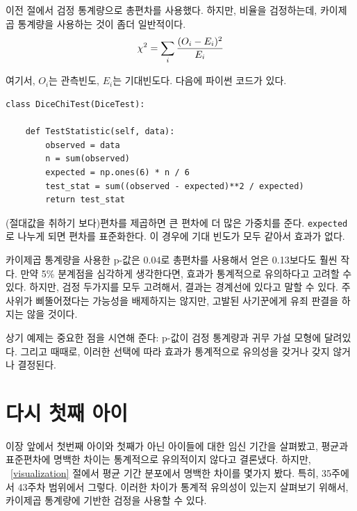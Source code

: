 이전 절에서 검정 통계량으로 총편차를 사용했다. 하지만,
비율을 검정하는데, 카이제곱 통계량을 사용하는 것이 좀더 일반적이다.
%
\[ \chi^2 = \sum_i \frac{(O_i - E_i)^2}{E_i} \]
%
% 

여기서, $O_i$는 관측빈도, $E_i$는 기대빈도다. 다음에 파이썬 코드가 있다.

\begin{verbatim}
class DiceChiTest(DiceTest):

    def TestStatistic(self, data):
        observed = data
        n = sum(observed)
        expected = np.ones(6) * n / 6
        test_stat = sum((observed - expected)**2 / expected)
        return test_stat
\end{verbatim}

(절대값을 취하기 보다)편차를 제곱하면 큰 편차에 더 많은 가중치를 준다.
{\tt expected}로 나누게 되면 편차를 표준화한다. 이 경우에 기대 빈도가 모두 같아서 효과가 없다.


카이제곱 통계량을 사용한 p-값은 0.04로 총편차를 사용해서 얻은 0.13보다도 훨씬 작다. 만약 5\% 분계점을 심각하게 생각한다면, 효과가 통계적으로 유의하다고 고려할 수 있다. 하지만, 검정 두가지를 모두 고려해서, 결과는 경계선에 있다고 말할 수 있다. 주사위가 삐뚤어졌다는 가능성을 배제하지는 않지만, 고발된 사기꾼에게 유죄 판결을 하지는 않을 것이다.


상기 예제는 중요한 점을 시연해 준다: p-값이 검정 통계량과 귀무 가설 모형에 달려있다. 그리고 때때로, 이러한 선택에 따라 효과가 통계적으로 유의성을 갖거나 갖지 않거나 결정된다.


\section{다시 첫째 아이}

이장 앞에서 첫번째 아이와 첫째가 아닌 아이들에 대한 임신 기간을 살펴봤고, 평균과 표준편차에 명백한 차이는 통계적으로 유의적이지 않다고 결론냈다. 하지만, ~\ref{visualization} 절에서 평균 기간 분포에서 명백한 차이를 몇가지 봤다. 특히, 35주에서 43주차 범위에서 그렇다. 이러한 차이가 통계적 유의성이 있는지 살펴보기 위해서, 카이제곱 통계량에 기반한 검정을 사용할 수 있다.

